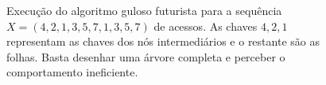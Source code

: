 \begin{figure}
    \caption{Execução do algoritmo guloso futurista para a sequência $X = (4,2,1,3,5,7,1,3,5,7)$ de acessos. As chaves $4,2,1$ representam as chaves dos nós intermediários e o restante são as folhas. Basta desenhar uma árvore completa e perceber o comportamento ineficiente.}
\label{fig:GreedyFuture-bit-reversal}
\end{figure}